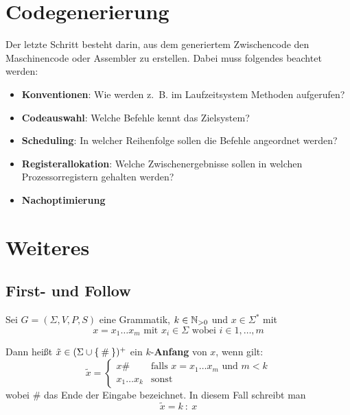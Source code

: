 \section{Codegenerierung}
Der letzte Schritt besteht darin, aus dem generiertem Zwischencode den
Maschinencode oder Assembler zu erstellen. Dabei muss folgendes beachtet werden:
\begin{itemize}
    \item \textbf{Konventionen}: Wie werden z.~B. im Laufzeitsystem Methoden aufgerufen?
    \item \textbf{Codeauswahl}: Welche Befehle kennt das Zielsystem?
    \item \textbf{Scheduling}: In welcher Reihenfolge sollen die Befehle angeordnet werden?
    \item \textbf{Registerallokation}: Welche Zwischenergebnisse sollen in welchen Prozessorregistern gehalten werden?
    \item \textbf{Nachoptimierung}
\end{itemize}

\section{Weiteres}
\subsection{First- und Follow}
\begin{definition}[$k$-Anfang]%
    Sei $G = (\Sigma, V, P, S)$ eine Grammatik, $k \in \mathbb{N}_{> 0}$ und
    $x \in \Sigma^*$ mit
    \[x = x_1 \dots x_m \text{ mit } x_i \in \Sigma \text{ wobei } i \in 1, \dots, m\]

    Dann heißt $\tilde{x} \in (\Sigma \cup \Set{\#})^+$ ein $k$-\textbf{Anfang} von $x$,
    wenn gilt:
    \[\tilde{x} =
    \begin{cases}
        x\#           &\text{falls } x = x_1 \dots x_m \text{ und } m < k\\
        x_1 \dots x_k &\text{sonst}
    \end{cases}\]
    wobei $\#$ das Ende der Eingabe bezeichnet. In diesem Fall schreibt man
    \[ \tilde{x} = k\ :\ x\]
\end{definition}

